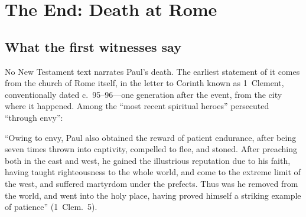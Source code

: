 \section{The End: Death at Rome}

\subsection{What the first witnesses say}

No New Testament text narrates Paul's death. The earliest statement of it
comes from the church of Rome itself, in the letter to Corinth known as
1~Clement, conventionally dated c.~95--96---one generation after the
event, from the city where it happened. Among the ``most recent spiritual
heroes'' persecuted ``through envy'':

\begin{studyframe}\small
``Owing to envy, Paul also obtained the reward of patient endurance, after
being seven times thrown into captivity, compelled to flee, and stoned.
After preaching both in the east and west, he gained the illustrious
reputation due to his faith, having taught righteousness to the whole
world, and come to the extreme limit of the west, and suffered martyrdom
under the prefects. Thus was he removed from the world, and went into the
holy place, having proved himself a striking example of patience''
(1~Clem.\ 5).
\end{studyframe}

